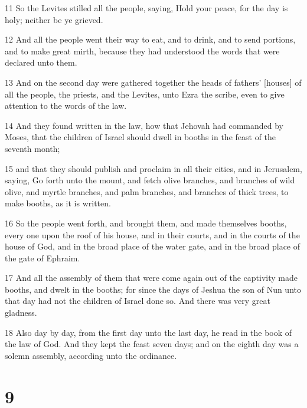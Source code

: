 \par 11 So the Levites stilled all the people, saying, Hold your peace, for the day is holy; neither be ye grieved.
\par 12 And all the people went their way to eat, and to drink, and to send portions, and to make great mirth, because they had understood the words that were declared unto them.
\par 13 And on the second day were gathered together the heads of fathers' [houses] of all the people, the priests, and the Levites, unto Ezra the scribe, even to give attention to the words of the law.
\par 14 And they found written in the law, how that Jehovah had commanded by Moses, that the children of Israel should dwell in booths in the feast of the seventh month;
\par 15 and that they should publish and proclaim in all their cities, and in Jerusalem, saying, Go forth unto the mount, and fetch olive branches, and branches of wild olive, and myrtle branches, and palm branches, and branches of thick trees, to make booths, as it is written.
\par 16 So the people went forth, and brought them, and made themselves booths, every one upon the roof of his house, and in their courts, and in the courts of the house of God, and in the broad place of the water gate, and in the broad place of the gate of Ephraim.
\par 17 And all the assembly of them that were come again out of the captivity made booths, and dwelt in the booths; for since the days of Jeshua the son of Nun unto that day had not the children of Israel done so. And there was very great gladness.
\par 18 Also day by day, from the first day unto the last day, he read in the book of the law of God. And they kept the feast seven days; and on the eighth day was a solemn assembly, according unto the ordinance.

\chapter{9}

